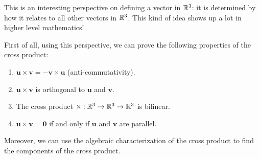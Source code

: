 This is an interesting perspective on defining a vector in $\mathbb{R}^3$: it is determined by how it relates to all other vectors in $\mathbb{R}^3$.  This kind of idea shows up a lot in higher level mathematics!

First of all, using this perspective, we can prove the following properties of the cross product: 

\begin{theorem}
    
    \begin{enumerate}
        \item $\bm{u} \times \bm{v} = - \bm{v} \times \bm{u}$ (anti-commutativity).
        \item $\bm{u} \times \bm{v}$ is orthogonal to $\bm{u}$ and $\bm{v}$.
        \item The cross product $\times : \mathbb{R}^3 \to \mathbb{R}^3 \to \mathbb{R}^3$ is bilinear.
        \item $\bm{u} \times \bm{v} = \bm{0}$ if and only if $\bm{u}$ and $\bm{v}$ are parallel.
    \end{enumerate}
    
    \end{theorem}

Moreover, we can use the algebraic characterization of the cross product to find the components of the cross product.  

